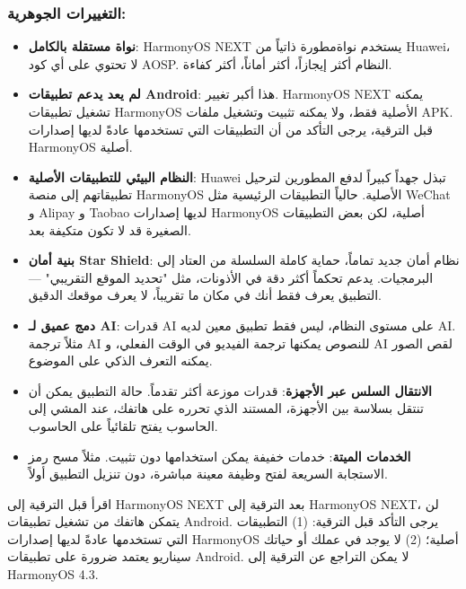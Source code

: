\subsubsection*{التغييرات الجوهرية:}

\begin{itemize}
  \item \textbf{نواة مستقلة بالكامل}: HarmonyOS NEXT يستخدم نواةمطورة ذاتياً من Huawei، لا تحتوي على أي كود AOSP. النظام أكثر إيجازاً، أكثر أماناً، أكثر كفاءة.
  \item \textbf{لم يعد يدعم تطبيقات Android}: هذا أكبر تغيير. HarmonyOS NEXT يمكنه تشغيل تطبيقات HarmonyOS الأصلية فقط، ولا يمكنه تثبيت وتشغيل ملفات APK. قبل الترقية، يرجى التأكد من أن التطبيقات التي تستخدمها عادةً لديها إصدارات HarmonyOS أصلية.
  \item \textbf{النظام البيئي للتطبيقات الأصلية}: Huawei تبذل جهداً كبيراً لدفع المطورين لترحيل تطبيقاتهم إلى منصة HarmonyOS الأصلية. حالياً التطبيقات الرئيسية مثل WeChat و Alipay و Taobao لديها إصدارات HarmonyOS أصلية، لكن بعض التطبيقات الصغيرة قد لا تكون متكيفة بعد.
  \item \textbf{بنية أمان Star Shield}: نظام أمان جديد تماماً، حماية كاملة السلسلة من العتاد إلى البرمجيات. يدعم تحكماً أكثر دقة في الأذونات، مثل "تحديد الموقع التقريبي" — التطبيق يعرف فقط أنك في مكان ما تقريباً، لا يعرف موقعك الدقيق.
  \item \textbf{دمج عميق لـ AI}: قدرات AI على مستوى النظام، ليس فقط تطبيق معين لديه AI. مثلاً ترجمة AI للنصوص يمكنها ترجمة الفيديو في الوقت الفعلي، و AI لقص الصور يمكنه التعرف الذكي على الموضوع.
  \item \textbf{الانتقال السلس عبر الأجهزة}: قدرات موزعة أكثر تقدماً. حالة التطبيق يمكن أن تنتقل بسلاسة بين الأجهزة، المستند الذي تحرره على هاتفك، عند المشي إلى الحاسوب يفتح تلقائياً على الحاسوب.
  \item \textbf{الخدمات الميتة}: خدمات خفيفة يمكن استخدامها دون تثبيت. مثلاً مسح رمز الاستجابة السريعة لفتح وظيفة معينة مباشرة، دون تنزيل التطبيق أولاً.
\end{itemize}

\begin{tcbwarn}{اقرأ قبل الترقية إلى HarmonyOS NEXT}
بعد الترقية إلى HarmonyOS NEXT، لن يتمكن هاتفك من تشغيل تطبيقات Android. يرجى التأكد قبل الترقية: (1) التطبيقات التي تستخدمها عادةً لديها إصدارات HarmonyOS أصلية؛ (2) لا يوجد في عملك أو حياتك سيناريو يعتمد ضرورة على تطبيقات Android. لا يمكن التراجع عن الترقية إلى HarmonyOS 4.3.

\end{tcbwarn}


